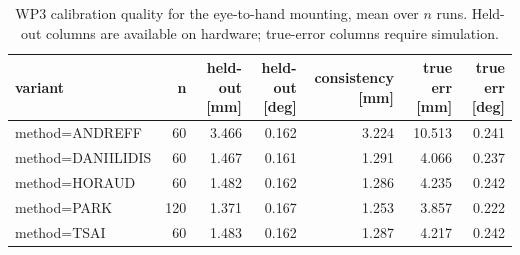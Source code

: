 \begin{table}[htbp]
  \centering
  \caption{WP3 calibration quality for the eye-to-hand mounting, mean over $n$ runs. Held-out columns are available on hardware; true-error columns require simulation.}
  \label{tab:wp3-summary-eye-to-hand}
  \begin{tabular}{lrrrrrr}
    \toprule
    variant & n & held-out [mm] & held-out [deg] & consistency [mm] & true err [mm] & true err [deg] \\
    \midrule
    method=ANDREFF & 60 & 3.466 & 0.162 & 3.224 & 10.513 & 0.241 \\
    method=DANIILIDIS & 60 & 1.467 & 0.161 & 1.291 & 4.066 & 0.237 \\
    method=HORAUD & 60 & 1.482 & 0.162 & 1.286 & 4.235 & 0.242 \\
    method=PARK & 120 & 1.371 & 0.167 & 1.253 & 3.857 & 0.222 \\
    method=TSAI & 60 & 1.483 & 0.162 & 1.287 & 4.217 & 0.242 \\
    \bottomrule
  \end{tabular}
\end{table}
